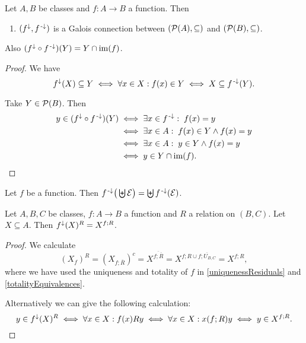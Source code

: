\begin{proposition}
Let $A,B$ be classes and $f:A\to B$ a function. Then
\begin{enumerate}
\item $(f^\downarrow,f^{\text{\hspace{0.15em}-}\downarrow})$ is a Galois connection between $\left( \operatorname{\mathcal{P}}(A), \subseteq \right)$ and $\left( \operatorname{\mathcal{P}}(B), \subseteq \right)$.
\end{enumerate}
Also $(f^\downarrow\circ f^{{\text{\hspace{0.15em}-}\downarrow}})(Y) = Y\cap \operatorname{im}(f)$.
\end{proposition}
\begin{proof}
We have
\[ f^\downarrow(X) \subseteq Y \iff \forall x\in X: f(x) \in Y \iff X \subseteq f^{{\text{\hspace{0.15em}-}\downarrow}}(Y). \]

Take $Y\in \operatorname{\mathcal{P}}(B)$. Then
\begin{align*}
y\in (f^\downarrow\circ f^{{\text{\hspace{0.15em}-}\downarrow}})(Y) &\iff \exists x\in f^{{\text{\hspace{0.15em}-}\downarrow}}:\; f(x) = y \\
&\iff \exists x\in A: \;f(x)\in Y \land f(x) = y \\
&\iff \exists x\in A: \;y \in Y \land f(x) = y \\
&\iff y\in Y\cap \operatorname{im}(f).
\end{align*}
\end{proof}





\begin{lemma}
Let $f$ be a function. Then $f^{{\text{\hspace{0.15em}-}\downarrow}}\big(\biguplus \mathcal{E}\big) = \biguplus f^{\text{\hspace{0.15em}-}\downarrow}(\mathcal{E})$.
\end{lemma}

\begin{lemma} \label{functionUpperbound}
Let $A,B,C$ be classes, $f: A\to B$ a function and $R$ a relation on $(B,C)$. Let $X \subseteq A$. Then $f^\downarrow(X)^R = X^{f;R}$.
\end{lemma}
\begin{proof}
We calculate
\[ (X_f)^{R} = (X_{f;\overline{R}})^c = X^{\overline{f;\overline{R}}} = X^{f;R \cup \overline{f;U_{B,C}}} = X^{f;R}, \]
where we have used the uniqueness and totality of $f$ in \ref{uniquenessResiduals} and \ref{totalityEquivalences}.

Alternatively we can give the following calculation:
\[ y\in f^\downarrow(X)^R \iff \forall x\in X: f(x)Ry \iff \forall x\in X: x(f;R)y \iff y\in X^{f;R}. \]
\end{proof}

